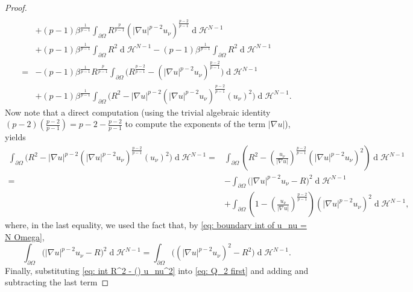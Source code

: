 \documentclass[10pt,a4paper]{amsart}
\numberwithin{equation}{section}
\renewcommand{\d}[1]{\ensuremath{\operatorname{d}\!{#1}}}
\begin{document}
\begin{proof}
\begin{equation}
\begin{split}
    \\
    & + (p-1) \beta^{\frac{1}{p-1}} \int_{\partial\Omega} R^{\frac{p}{p-1}} (|\nabla u|^{p-2} u_\nu)^{\frac{p-2}{p-1}} \d{}\mathcal{H}^{N-1}
    \\
    &  + (p-1) \beta^{\frac{1}{p-1}} \int_{\partial\Omega} R^2 \d{}\mathcal{H}^{N-1} - (p-1) \beta^{\frac{1}{p-1}} \int_{\partial\Omega} R^2 \d{}\mathcal{H}^{N-1} 
    \\
     = & - (p-1) \beta^{\frac{1}{p-1}} R^{\frac{p}{p-1}} \int_{\partial\Omega} \Big( R^{\frac{p-2}{p-1}} - (|\nabla u|^{p-2} u_\nu)^{\frac{p-2}{p-1}} \Big) \d{}\mathcal{H}^{N-1} 
    \\
    &  + (p-1) \beta^{\frac{1}{p-1}} \int_{\partial\Omega} \Big( R^2 - |\nabla u|^{p-2} (|\nabla u|^{p-2} u_\nu)^{\frac{p-2}{p-1}} (u_\nu)^2 \Big) \d{}\mathcal{H}^{N-1}. 
    \end{split}
    \end{equation}
    Now note that a direct computation (using the trivial algebraic identity $(p-2)\left( \frac{p-2}{p-1}\right) = p-2 - \frac{p-2}{p-1} $ to compute the exponents of the term $|\nabla u|$), yields
    \begin{equation}\label{eq: int R^2 - () u_nu^2}
    \begin{split}
        \int_{\partial\Omega} \Big( R^2 - |\nabla u|^{p-2} (|\nabla u|^{p-2} u_\nu)^{\frac{p-2}{p-1}} (u_\nu)^2 \Big) \d{}\mathcal{H}^{N-1} =& \int_{\partial\Omega} \left( R^2 - \left(\frac{u_\nu}{|\nabla u|}\right)^{\frac{p-2}{p-1}} (|\nabla u|^{p-2} u_\nu)^2 \right) \d{}\mathcal{H}^{N-1} 
        \\
        = & - \int_{\partial\Omega} \Big(|\nabla u|^{p-2} u_\nu - R \Big)^2  \d{}\mathcal{H}^{N-1} 
        \\
        &+
        \int_{\partial\Omega} \left(1- \left(\frac{u_\nu}{|\nabla u|}\right)^{\frac{p-2}{p-1}} \right) (|\nabla u|^{p-2} u_\nu)^2 \d{}\mathcal{H}^{N-1}, 
    \end{split}
    \end{equation}
    where, in the last equality, we used the fact that, by \eqref{eq: boundary int of u_nu = N Omega},
    \begin{equation*}
         \int_{\partial\Omega} \Big(|\nabla u|^{p-2} u_\nu - R \Big)^2  \d{}\mathcal{H}^{N-1} =  \int_{\partial\Omega} \Big( (|\nabla u|^{p-2} u_\nu)^2 - R^2 \Big)  \d{}\mathcal{H}^{N-1}.
    \end{equation*}
    Finally, substituting \eqref{eq: int R^2 - () u_nu^2} into \eqref{eq: Q_2 first} and adding and subtracting the last term 

\end{proof}
\end{document}
